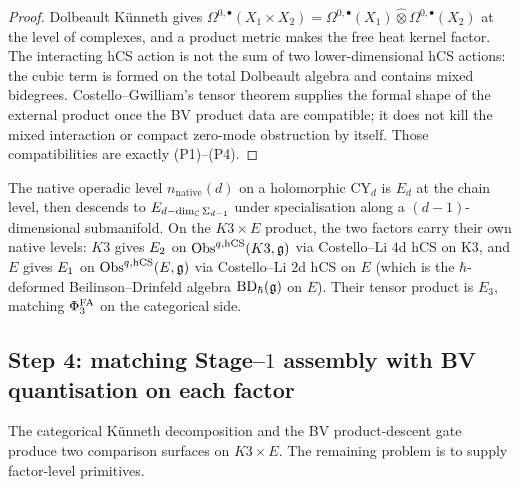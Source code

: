 \begin{proof}
Dolbeault K\"unneth gives
$\Omega^{0,\bullet}(X_1 \times X_2)=
\Omega^{0,\bullet}(X_1)\widehat\otimes
\Omega^{0,\bullet}(X_2)$ at the level of complexes, and a product
metric makes the free heat kernel factor. The interacting hCS action is
not the sum of two lower-dimensional hCS actions: the cubic term is
formed on the total Dolbeault algebra and contains mixed bidegrees.
Costello--Gwilliam's tensor theorem supplies the formal shape of the
external product once the BV product data are compatible; it does not
kill the mixed interaction or compact zero-mode obstruction by itself.
Those compatibilities are exactly \textup{(P1)--(P4)}.
\end{proof}

\begin{remark}
\label{rem:agent06-EnEoneEtwo}
The native operadic level $n_{\mathrm{native}}(d)$ on a
holomorphic CY$_d$ is $E_d$ at the chain level, then descends to
$E_{d - \dim_\mathbb C \Sigma_{d-1}}$ under specialisation along a
$(d-1)$-dimensional submanifold. On the $K3 \times E$ product, the
two factors carry their own native levels: $K3$ gives $E_2$ on
$\mathrm{Obs}^{q,\mathrm{hCS}}(K3, \mathfrak g)$ via Costello--Li $4$d hCS on K3, and $E$
gives $E_1$ on $\mathrm{Obs}^{q,\mathrm{hCS}}(E, \mathfrak g)$ via Costello--Li $2$d hCS
on $E$ (which is the $\hbar$-deformed Beilinson--Drinfeld algebra
$\mathrm{BD}_\hbar(\mathfrak g)$ on $E$). Their tensor product is $E_3$,
matching $\Phi^{\mathrm{FA}}_3$ on the categorical side.
\end{remark}

\subsection*{Step 4: matching Stage--$1$ assembly with BV quantisation
on each factor}
\label{sec:agent06-step4-factor-matching}

The categorical K\"unneth decomposition and the BV product-descent gate
produce two comparison surfaces on $K3 \times E$. The remaining
problem is to supply factor-level primitives.

